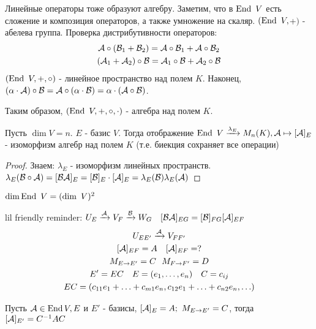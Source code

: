 \documentclass[main]{subfiles}
\begin{document}
Линейные операторы тоже образуют алгебру. Заметим, что в $\operatorname{End} \ V$ есть сложение и композиция операторов, а также умножение на скаляр. 
$(\End \ V, $+$)$ - абелева группа. Проверка дистрибутивности операторов:
\begin{gather*}
    \mathcal{A}\circ(\mathcal{B}_1+\mathcal{B}_2) = \mathcal{A}\circ\mathcal{B}_1 + \mathcal{A}\circ\mathcal{B}_2 \\
    (\mathcal{A}_1 + \mathcal{A}_2)\circ\mathcal{B} = \mathcal{A}_1\circ\mathcal{B}+\mathcal{A}_2\circ\mathcal{B}
\end{gather*}
$(\operatorname{End} \ V, +, \circ)$ - линейное пространство над полем $K$. Наконец,
$(\alpha\cdot\mathcal{A})\circ\mathcal{B}=\mathcal{A}\circ(\alpha\cdot\mathcal{B})=\alpha\cdot(\mathcal{A}\circ\mathcal{B})$.
 
Таким образом, $(\operatorname{End} \ V, +, \circ, \cdot)$ - алгебра над полем $K$.




\begin{proposition}
Пусть $\dim V = n$. $E$ - базис $V$. 
Тогда отображение $\operatorname{End} \ V \xrightarrow{\lambda_E} M_n(K), \mathcal{A} \mapsto [\mathcal{A}]_E$ - изоморфизм алгебр над полем $K$ (т.е. биекция сохраняет все операции)
\end{proposition}

\begin{proof}
    Знаем: $\lambda_E$ - изоморфизм линейных пространств. $\lambda_E(\mathcal{B}\circ\mathcal{A})=[\mathcal{B}\mathcal{A}]_E=[\mathcal{B}]_E\cdot[\mathcal{A}]_E = \lambda_E(\mathcal{B})\lambda_E(\mathcal{A})$  
\end{proof}

\begin{corollary}
$\dim \operatorname{End}\ V = (\dim \ V)^2 $
\end{corollary}

lil friendly reminder: $U_E \xrightarrow{\mathcal{A}} V_F \xrightarrow{\mathcal{B}} W_G \quad 
    [\mathcal{B}\mathcal{A}]_{EG} = [\mathcal{B}]_{FG}[\mathcal{A}]_{EF}
    $
\begin{gather*}
    U_{EE'} \xrightarrow{\mca} V_{FF'} \\
    [\mca]_{EF}=A \quad [\mca]_{EF}=? \\
    M_{E\rightarrow E'} = C \ \ M_{F\rightarrow F'} = D \\
    E' = EC \quad E=(e_1, \ldots ,e_n) \quad C=c_{ij} \\
    EC=(c_{11}e_1+\ldots+c_{m1}e_n, c_{12}e_1+\ldots +c_{n2}e_n, \ldots) \\
\end{gather*}  

\begin{proposition} 
    Пусть $\mathcal{A} \in \operatorname{End} V, E$ и $E'$ - базисы, $[\mathcal{A}]_{E}=A; \ M_{E\rightarrow E'}=C$, тогда $[\mathcal{A}]_{E'}=C^{-1}AC$
\end{proposition}
\end{document}
